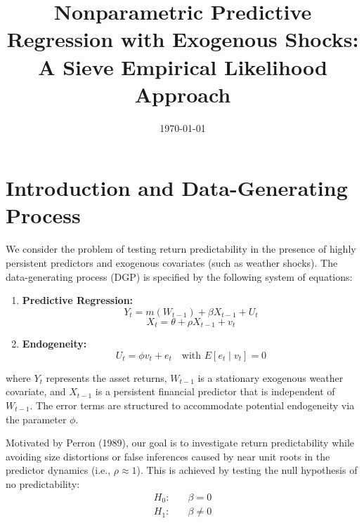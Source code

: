 \documentclass{article}
\begin{document}
\title{Nonparametric Predictive Regression with Exogenous Shocks: A Sieve Empirical Likelihood Approach}
\author{}
\date{\today}
\maketitle

\section{Introduction and Data-Generating Process}

We consider the problem of testing return predictability in the presence of highly persistent predictors and exogenous covariates (such as weather shocks). The data-generating process (DGP) is specified by the following system of equations:

\begin{enumerate}
    \item \textbf{Predictive Regression:}
    \begin{equation}
        Y_t = m(W_{t-1}) + \beta X_{t-1} + U_t
    \end{equation}
    \begin{equation}
        X_t = \theta + \rho X_{t-1} + v_t
    \end{equation}
    
    \item \textbf{Endogeneity:}
    \begin{equation}
        U_t = \phi v_t + e_t \quad \text{with } E[e_t \mid v_t] = 0
    \end{equation}
\end{enumerate}
where $Y_t$ represents the asset returns, $W_{t-1}$ is a stationary exogenous weather covariate, and $X_{t-1}$ is a persistent financial predictor that is independent of $W_{t-1}$. The error terms are structured to accommodate potential endogeneity via the parameter $\phi$.

Motivated by Perron (1989), our goal is to investigate return predictability while avoiding size distortions or false inferences caused by near unit roots in the predictor dynamics (i.e., $\rho \approx 1$). This is achieved by testing the null hypothesis of no predictability:
\begin{equation} 
\begin{aligned}
    H_0: \quad &\beta = 0 \\
    H_1: \quad &\beta \neq 0
\end{aligned}
\end{equation}
\end{document}
